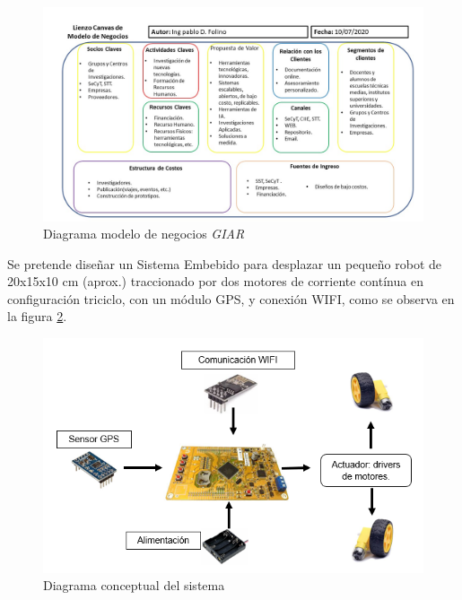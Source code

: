 \documentclass[11pt]{charter}
\begin{document}
\begin{figure}[htpb]
\centering 
\includegraphics[width=\textwidth]{./Figuras/GIAR.jpg}
\caption{Diagrama modelo de negocios \textit{GIAR}}
\label{fig:ModNegGIAR}
\end{figure}


Se pretende diseñar un Sistema Embebido para desplazar un pequeño robot de 20x15x10 cm (aprox.) traccionado por dos motores de corriente contínua en configuración triciclo, con  un módulo GPS, y conexión WIFI, como se observa en la figura \ref{fig:diagConceptual}. 


\vspace{25px}

\begin{figure}[htpb]
\centering 
\includegraphics[width=.8\textwidth]{./Figuras/Robot.png}
\caption{Diagrama conceptual del sistema}
\label{fig:diagConceptual}
\end{figure}
\end{document}
